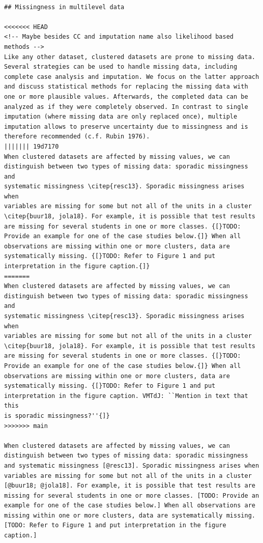 \documentclass[
]{jss}
\begin{document}
\begin{verbatim}

## Missingness in multilevel data

<<<<<<< HEAD
<!-- Maybe besides CC and imputation name also likelihood based methods -->
Like any other dataset, clustered datasets are prone to missing data. Several strategies can be used to handle missing data, including complete case analysis and imputation. We focus on the latter approach and discuss statistical methods for replacing the missing data with one or more plausible values. Afterwards, the completed data can be analyzed as if they were completely observed. In contrast to single imputation (where missing data are only replaced once), multiple imputation allows to preserve uncertainty due to missingness and is therefore recommended (c.f. Rubin 1976). 
||||||| 19d7170
When clustered datasets are affected by missing values, we can
distinguish between two types of missing data: sporadic missingness and
systematic missingness \citep{resc13}. Sporadic missingness arises when
variables are missing for some but not all of the units in a cluster
\citep{buur18, jola18}. For example, it is possible that test results
are missing for several students in one or more classes. {[}TODO:
Provide an example for one of the case studies below.{]} When all
observations are missing within one or more clusters, data are
systematically missing. {[}TODO: Refer to Figure 1 and put
interpretation in the figure caption.{]}
=======
When clustered datasets are affected by missing values, we can
distinguish between two types of missing data: sporadic missingness and
systematic missingness \citep{resc13}. Sporadic missingness arises when
variables are missing for some but not all of the units in a cluster
\citep{buur18, jola18}. For example, it is possible that test results
are missing for several students in one or more classes. {[}TODO:
Provide an example for one of the case studies below.{]} When all
observations are missing within one or more clusters, data are
systematically missing. {[}TODO: Refer to Figure 1 and put
interpretation in the figure caption. VMTdJ: ``Mention in text that this
is sporadic missingness?''{]}
>>>>>>> main

When clustered datasets are affected by missing values, we can distinguish between two types of missing data: sporadic missingness and systematic missingness [@resc13]. Sporadic missingness arises when variables are missing for some but not all of the units in a cluster [@buur18; @jola18]. For example, it is possible that test results are missing for several students in one or more classes. [TODO: Provide an example for one of the case studies below.] When all observations are missing within one or more clusters, data are systematically missing. [TODO: Refer to Figure 1 and put interpretation in the figure caption.]


\end{verbatim}
\end{document}
